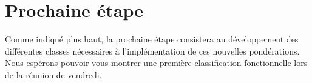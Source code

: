 \documentclass{article}
\begin{document}
\section{Prochaine étape}
Comme indiqué plus haut, la prochaine étape consistera au développement des différentes classes nécessaires à l'implémentation de ces nouvelles pondérations. Nous espérons pouvoir vous montrer une première classification fonctionnelle lors de la réunion de vendredi.



\end{document}
